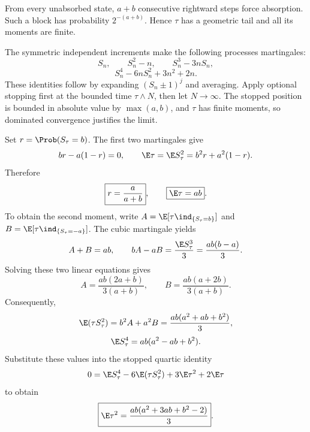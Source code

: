 From every unabsorbed state, $a+b$ consecutive rightward steps force absorption. Such a block has probability $2^{-(a+b)}$. Hence $\tau$ has a geometric tail and all its moments are finite.

The symmetric independent increments make the following processes martingales:
\[
 S_n,\qquad S_n^2-n,\qquad S_n^3-3nS_n,
\]
\[
 S_n^4-6nS_n^2+3n^2+2n.
\]
These identities follow by expanding $(S_n\pm1)^j$ and averaging. Apply optional stopping first at the bounded time $\tau\wedge N$, then let $N\to\infty$. The stopped position is bounded in absolute value by $\max(a,b)$, and $\tau$ has finite moments, so dominated convergence justifies the limit.

Set $r=\Prob(S_\tau=b)$. The first two martingales give
\[
 br-a(1-r)=0,\qquad
 \E\tau=\E S_\tau^2=b^2r+a^2(1-r).
\]
Therefore
\[
 \boxed{r=\frac a{a+b}},\qquad \boxed{\E\tau=ab}.
\]
To obtain the second moment, write $A=\E[\tau\ind_{\{S_\tau=b\}}]$ and $B=\E[\tau\ind_{\{S_\tau=-a\}}]$. The cubic martingale yields
\[
 A+B=ab,\qquad
 bA-aB=\frac{\E S_\tau^3}{3}=\frac{ab(b-a)}3.
\]
Solving these two linear equations gives
\[
 A=\frac{ab(2a+b)}{3(a+b)},\qquad
 B=\frac{ab(a+2b)}{3(a+b)}.
\]
Consequently,
\[
 \E(\tau S_\tau^2)=b^2A+a^2B
       =\frac{ab(a^2+ab+b^2)}3,
\]
\[
 \E S_\tau^4=ab(a^2-ab+b^2).
\]
Substitute these values into the stopped quartic identity
\[
 0=\E S_\tau^4-6\E(\tau S_\tau^2)
       +3\E\tau^2+2\E\tau
\]
to obtain
\[
 \boxed{\E\tau^2=\frac{ab(a^2+3ab+b^2-2)}3}.
\]
